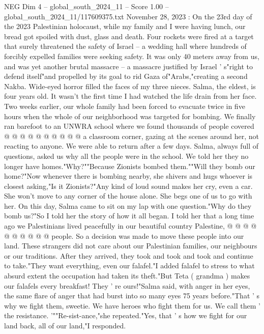 \begin{textsample}{NEG Dim 4 – global\_south\_2024\_11 – Score 1.00 – global\_south\_2024\_11/117609375.txt}  \label{ex:f4_neg_177}
November 28, 2023 : On the 23rd day of the 2023 Palestinian holocaust, while my family and I were having lunch, our bread got spoiled with dust, glass and death.
Four rockets were fired at a target that surely threatened the safety of Israel -- a wedding hall where hundreds of forcibly expelled families were seeking safety.
It was only 40 meters away from us, and was yet another brutal massacre -- a massacre justified by Israel ' s"right to defend itself"and propelled by its goal to rid Gaza of"Arabs,"creating a second Nakba.
Wide-eyed horror filled the faces of my three nieces.
Salma, the eldest, is four years old.
It wasn't the first time I had watched the life drain from her face.
Two weeks earlier, our whole family had been forced to evacuate twice in five hours when the whole of our neighborhood was targeted for bombing.
We finally ran barefoot to an UNWRA school where we found thousands of people covered @ @ @ @ @ @ @ @ @ @ a classroom corner, gazing at the scenes around her, not reacting to anyone.
We were able to return after a few days.
Salma, always full of questions, asked us why all the people were in the school.
We told her they no longer have homes."Why?""Because Zionists bombed them.""Will they bomb our home?"Now whenever there is bombing nearby, she shivers and hugs whoever is closest asking,"Is it Zionists?"Any kind of loud sound makes her cry, even a car.
She won't move to any corner of the house alone.
She begs one of us to go with her.
On this day, Salma came to sit on my lap with one question."Why do they bomb us?"So I told her the story of how it all began.
I told her that a long time ago we Palestinians lived peacefully in our beautiful country Palestine, @ @ @ @ @ @ @ @ @ @ people.
So a decision was made to move these people into our land.
These strangers did not care about our Palestinian families, our neighbours or our traditions.
After they arrived, they took and took and took and continue to take."They want everything, even our falafel."I added falafel to stress to what absurd extent the occupation had taken its theft."But Teta ( grandma ) makes our falafels every breakfast!
They ' re ours!"Salma said, with anger in her eyes, the same flare of anger that had burst into so many eyes 75 years before."That ' s why we fight them, sweetie.
We have heroes who fight them for us.
We call them ' the resistance. '""Re-sist-ance,"she repeated."Yes, that ' s how we fight for our land back, all of our land,"I responded.

\end{textsample}
